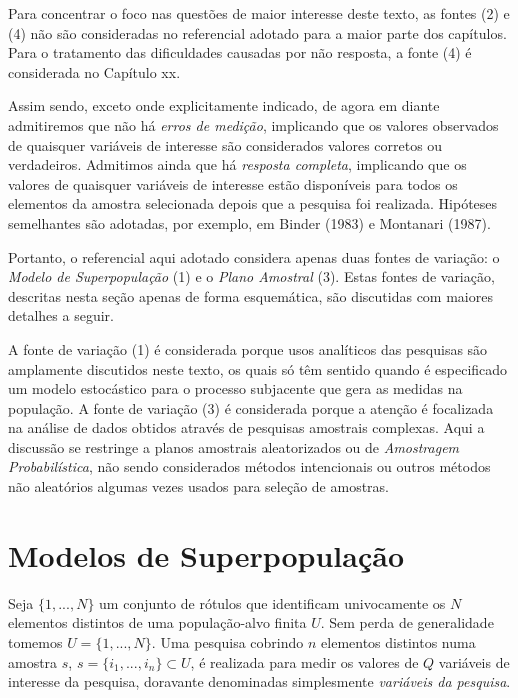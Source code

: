 \documentclass[
  12pt,
  brazilian,
]{book}
\theoremstyle{definition}
\theoremstyle{definition}
\theoremstyle{definition}
\theoremstyle{definition}
\theoremstyle{remark}
\begin{document}
Para concentrar o foco nas questões de maior interesse deste texto, as fontes
(2) e (4) não são consideradas no referencial adotado para a maior parte dos
capítulos. Para o tratamento das dificuldades causadas por não resposta, a fonte
(4) é considerada no Capítulo xx.

Assim sendo, exceto onde explicitamente indicado, de agora em diante admitiremos que não há \emph{erros de medição}, implicando que os valores observados de quaisquer variáveis de interesse são considerados valores corretos ou verdadeiros. Admitimos ainda que há \emph{resposta completa}, implicando que os valores de quaisquer variáveis de interesse estão disponíveis para todos os elementos da amostra selecionada depois que a pesquisa foi realizada. Hipóteses semelhantes são adotadas, por exemplo, em Binder (1983) e Montanari (1987).

Portanto, o referencial aqui adotado considera apenas duas fontes de variação: o \emph{Modelo de Superpopulação} (1) e o \emph{Plano Amostral} (3). Estas fontes de variação, descritas nesta seção apenas de forma esquemática, são discutidas com maiores detalhes a seguir.

A fonte de variação (1) é considerada porque usos analíticos das pesquisas
são amplamente discutidos neste texto, os quais só têm sentido quando é
especificado um modelo estocástico para o processo subjacente que gera as
medidas na população. A fonte de variação (3) é considerada porque a atenção
é focalizada na análise de dados obtidos através de pesquisas amostrais
complexas. Aqui a discussão se restringe a planos amostrais aleatorizados ou
de \emph{Amostragem Probabilística}, não sendo considerados métodos intencionais ou
outros métodos não aleatórios algumas vezes usados para seleção de amostras.

\hypertarget{modelos-de-superpopulauxe7uxe3o}{%
\section{Modelos de Superpopulação}\label{modelos-de-superpopulauxe7uxe3o}}

Seja \(\{1, ..., N\}\) um conjunto de rótulos que identificam univocamente os \(N\)
elementos distintos de uma população-alvo finita \(U\). Sem perda de generalidade
tomemos \(U=\{1,...,N\}\). Uma pesquisa cobrindo \(n\) elementos distintos numa
amostra \(s\), \(s=\{i_{1},...,i_{n}\} \subset U\), é realizada para medir os valores
de \(Q\) variáveis de interesse da pesquisa, doravante denominadas simplesmente
\emph{variáveis da pesquisa}.
\end{document}
